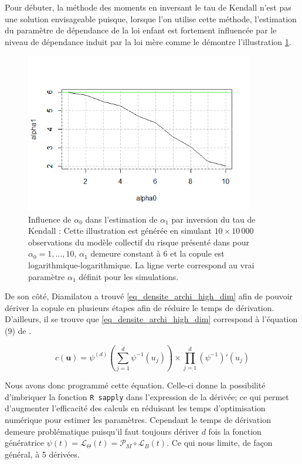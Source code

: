 \documentclass{article}
\begin{document}
	Pour débuter, la méthode des moments en inversant le tau de Kendall n'est pas une solution envisageable puisque, lorsque l'on utilise cette méthode, l'estimation du paramètre de dépendance de la loi enfant est fortement influencée par le niveau de dépendance induit par la loi mère comme le démontre l'illustration \ref{graph_alpha1_fct_de_alpha0}.
	
	\begin{figure}[ht]
		\centering
		\includegraphics[height=7cm]{graph/alpha1_fct_de_alpha0.png}
		\caption[Influence de $\alpha_{0}$ dans l'estimation de $\alpha_1$ par inversion du tau de Kendall]{Influence de $\alpha_{0}$ dans l'estimation de $\alpha_1$ par inversion du tau de Kendall : 
			Cette illustration est générée en simulant $10 \times 10\,000$ observations du modèle collectif du risque présenté dans \cite{Itre5} pour $\alpha_{0} = 1,\dots, 10$, $\alpha_{1}$ demeure constant à $6$ et la copule est logarithmique-logarithmique. La ligne verte correspond au vrai paramètre $\alpha_1$ définit pour les simulations.}
		\label{graph_alpha1_fct_de_alpha0}
	\end{figure}

	De son côté, Diamilatou a trouvé \eqref{eq_densite_archi_high_dim} afin de pouvoir dériver la copule en plusieurs étapes afin de réduire le temps de dérivation. D'ailleurs, il se trouve que \eqref{eq_densite_archi_high_dim} correspond à l'équation (9) de \cite{hofert2013ArchimedeanHighDimension}.
	
	\begin{equation} \label{eq_densite_archi_high_dim}
		c(\textbf{u}) = \psi^{(d)} \left(\sum_{j=1}^{d} \psi^{-1}(u_j) \right) \times \prod_{j=1}^{d} (\psi^{-1})'(u_j)
	\end{equation}
	
	Nous avons donc programmé cette équation. Celle-ci donne la possibilité d'imbriquer la fonction \texttt{R sapply} dans l'expression de la dérivée; ce qui permet d'augmenter l'efficacité des calculs en réduisant les temps d'optimisation numérique pour estimer les paramètres. Cependant le temps de dérivation demeure problématique puisqu'il faut toujours dériver $d$ fois la fonction génératrice $\psi(t) = \mathscr{L}_{\Theta}(t) = \mathcal{P}_{M} \circ \mathscr{L}_B(t)$. Ce qui nous limite, de façon général, à 5 dérivées.\\
	
\end{document}
